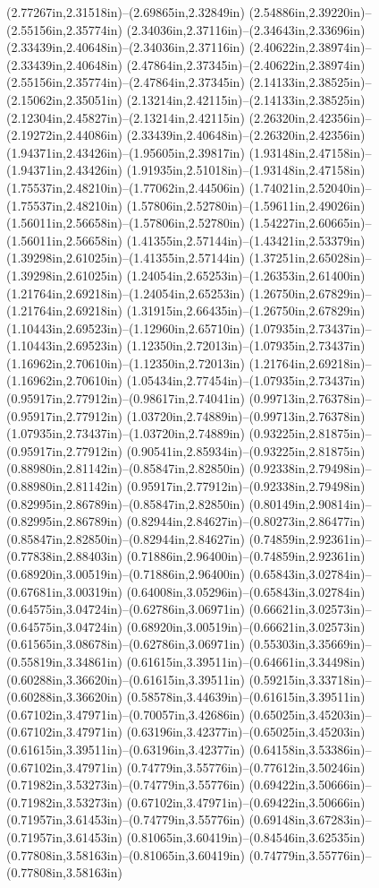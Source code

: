 (2.77267in,2.31518in)--(2.69865in,2.32849in) (2.54886in,2.39220in)--(2.55156in,2.35774in) (2.34036in,2.37116in)--(2.34643in,2.33696in) (2.33439in,2.40648in)--(2.34036in,2.37116in) (2.40622in,2.38974in)--(2.33439in,2.40648in) (2.47864in,2.37345in)--(2.40622in,2.38974in) (2.55156in,2.35774in)--(2.47864in,2.37345in) (2.14133in,2.38525in)--(2.15062in,2.35051in) (2.13214in,2.42115in)--(2.14133in,2.38525in) (2.12304in,2.45827in)--(2.13214in,2.42115in) (2.26320in,2.42356in)--(2.19272in,2.44086in) (2.33439in,2.40648in)--(2.26320in,2.42356in) (1.94371in,2.43426in)--(1.95605in,2.39817in) (1.93148in,2.47158in)--(1.94371in,2.43426in) (1.91935in,2.51018in)--(1.93148in,2.47158in) (1.75537in,2.48210in)--(1.77062in,2.44506in) (1.74021in,2.52040in)--(1.75537in,2.48210in) (1.57806in,2.52780in)--(1.59611in,2.49026in) (1.56011in,2.56658in)--(1.57806in,2.52780in) (1.54227in,2.60665in)--(1.56011in,2.56658in) (1.41355in,2.57144in)--(1.43421in,2.53379in) (1.39298in,2.61025in)--(1.41355in,2.57144in) (1.37251in,2.65028in)--(1.39298in,2.61025in) (1.24054in,2.65253in)--(1.26353in,2.61400in) (1.21764in,2.69218in)--(1.24054in,2.65253in) (1.26750in,2.67829in)--(1.21764in,2.69218in) (1.31915in,2.66435in)--(1.26750in,2.67829in) (1.10443in,2.69523in)--(1.12960in,2.65710in) (1.07935in,2.73437in)--(1.10443in,2.69523in) (1.12350in,2.72013in)--(1.07935in,2.73437in) (1.16962in,2.70610in)--(1.12350in,2.72013in) (1.21764in,2.69218in)--(1.16962in,2.70610in) (1.05434in,2.77454in)--(1.07935in,2.73437in) (0.95917in,2.77912in)--(0.98617in,2.74041in) (0.99713in,2.76378in)--(0.95917in,2.77912in) (1.03720in,2.74889in)--(0.99713in,2.76378in) (1.07935in,2.73437in)--(1.03720in,2.74889in) (0.93225in,2.81875in)--(0.95917in,2.77912in) (0.90541in,2.85934in)--(0.93225in,2.81875in) (0.88980in,2.81142in)--(0.85847in,2.82850in) (0.92338in,2.79498in)--(0.88980in,2.81142in) (0.95917in,2.77912in)--(0.92338in,2.79498in) (0.82995in,2.86789in)--(0.85847in,2.82850in) (0.80149in,2.90814in)--(0.82995in,2.86789in) (0.82944in,2.84627in)--(0.80273in,2.86477in) (0.85847in,2.82850in)--(0.82944in,2.84627in) (0.74859in,2.92361in)--(0.77838in,2.88403in) (0.71886in,2.96400in)--(0.74859in,2.92361in) (0.68920in,3.00519in)--(0.71886in,2.96400in) (0.65843in,3.02784in)--(0.67681in,3.00319in) (0.64008in,3.05296in)--(0.65843in,3.02784in) (0.64575in,3.04724in)--(0.62786in,3.06971in) (0.66621in,3.02573in)--(0.64575in,3.04724in) (0.68920in,3.00519in)--(0.66621in,3.02573in) (0.61565in,3.08678in)--(0.62786in,3.06971in) (0.55303in,3.35669in)--(0.55819in,3.34861in) (0.61615in,3.39511in)--(0.64661in,3.34498in) (0.60288in,3.36620in)--(0.61615in,3.39511in) (0.59215in,3.33718in)--(0.60288in,3.36620in) (0.58578in,3.44639in)--(0.61615in,3.39511in) (0.67102in,3.47971in)--(0.70057in,3.42686in) (0.65025in,3.45203in)--(0.67102in,3.47971in) (0.63196in,3.42377in)--(0.65025in,3.45203in) (0.61615in,3.39511in)--(0.63196in,3.42377in) (0.64158in,3.53386in)--(0.67102in,3.47971in) (0.74779in,3.55776in)--(0.77612in,3.50246in) (0.71982in,3.53273in)--(0.74779in,3.55776in) (0.69422in,3.50666in)--(0.71982in,3.53273in) (0.67102in,3.47971in)--(0.69422in,3.50666in) (0.71957in,3.61453in)--(0.74779in,3.55776in) (0.69148in,3.67283in)--(0.71957in,3.61453in) (0.81065in,3.60419in)--(0.84546in,3.62535in) (0.77808in,3.58163in)--(0.81065in,3.60419in) (0.74779in,3.55776in)--(0.77808in,3.58163in) 